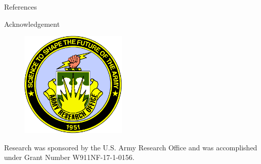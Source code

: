 \documentclass{beamer}
\begin{document}
\begin{frame}{}
\begin{textblock}{0.32}
\begin{block}{References}
    \end{block}
    \begin{block}{Acknowledgement}
        \begin{figure}[h]
            \centering
            \includegraphics[width=2in]{images/aro_logo_t.png}
            \label{fig:aro_logo}
        \end{figure}
        \centering
        Research was sponsored by the U.S. Army Research Office and was accomplished 
        under Grant Number W911NF-17-1-0156. 
    \end{block}
\end{textblock}
\end{frame}
\end{document}
